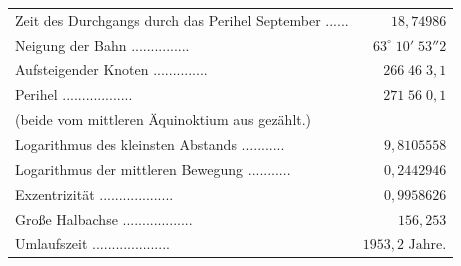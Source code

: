 \begin{center}\fontsize{9}{11}\selectfont\setlength{\tabcolsep}{3pt}\renewcommand{\arraystretch}{1.15}\begin{tabular}{lr}
Zeit des Durchgangs durch das Perihel September .\;.\;.\;.\;.\;.\; & $18{,}74986$\\
Neigung der Bahn .\;.\;.\;.\;.\;.\;.\;.\;.\;.\;.\;.\;.\;.\;.\; & $63^\circ\;10'\;53''2$\\
Aufsteigender Knoten .\;.\;.\;.\;.\;.\;.\;.\;.\;.\;.\;.\;.\;.\; & $266\;46\;3{,}1$\\
Perihel .\;.\;.\;.\;.\;.\;.\;.\;.\;.\;.\;.\;.\;.\;.\;.\;.\;.\; & $271\;56\;0{,}1$\\
\multicolumn{2}{l}{(beide vom mittleren Äquinoktium aus gezählt.)}\\
Logarithmus des kleinsten Abstands .\;.\;.\;.\;.\;.\;.\;.\;.\;.\;.\; & $9{,}8105558$\\
Logarithmus der mittleren Bewegung .\;.\;.\;.\;.\;.\;.\;.\;.\;.\;.\; & $0{,}2442946$\\
Exzentrizität .\;.\;.\;.\;.\;.\;.\;.\;.\;.\;.\;.\;.\;.\;.\;.\;.\;.\;.\; & $0{,}9958626$\\
Große Halbachse .\;.\;.\;.\;.\;.\;.\;.\;.\;.\;.\;.\;.\;.\;.\;.\;.\;.\; & $156{,}253$\\
Umlaufszeit .\;.\;.\;.\;.\;.\;.\;.\;.\;.\;.\;.\;.\;.\;.\;.\;.\;.\;.\;.\; & $1953{,}2\text{ Jahre.}$\\
\end{tabular}\end{center}
